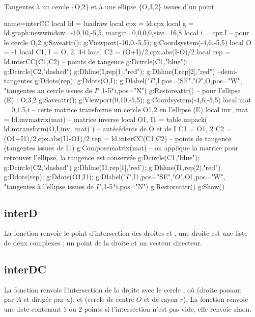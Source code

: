 \begin{demo}{Tangentes à un cercle \{O,2\} et à une ellipse \{O,3,2\} issues d'un point}
\begin{luadraw}{name=interCC}
local ld = luadraw
local cpx = ld.cpx
local g = ld.graph:new{window={-10,10,-5,5}, margin={0,0,0,0},size={16,8}}
local i = cpx.I
-- pour le cercle {O,2}
g:Saveattr(); g:Viewport(-10,0,-5,5); g:Coordsystem(-4,6,-5,5)
local O = -1
local C1, I = {O, 2}, 4-i
local C2 = {(O+I)/2,cpx.abs(I-O)/2}
local rep = ld.interCC(C1,C2) -- points de tangence
g:Dcircle(C1,"blue"); g:Dcircle(C2,"dashed")
g:Dhline(I,rep[1],"red"); g:Dhline(I,rep[2],"red") --demi-tangentes
g:Ddots(rep); g:Ddots({O,I}); g:Dlabel("$I$",I,{pos="SE"},"$O$",O,{pos="W"},
  "tangentes au cercle issues de $I$",1-5*i,{pos="N"})
g:Restoreattr()
-- pour l'ellipse (E) : {O,3,2}
g:Saveattr(); g:Viewport(0,10,-5,5); g:Coordsystem(-4,6,-5,5)
local mat = {0,1.5,i} -- cette matrice transforme un cercle {O1,2} en l'ellipse (E)
local inv_mat = ld.invmatrix(mat) -- matrice inverse
local O1, I1 = table.unpack( ld.mtransform({O,I},inv_mat) ) -- antécédents de O et de I
C1 = {O1, 2}
C2 = {(O1+I1)/2,cpx.abs(I1-O1)/2}
rep = ld.interCC(C1,C2) -- points de tangence (tangentes issues de I1)
g:Composematrix(mat) -- on applique la matrice pour retrouver l'ellipse, la tangence est conservée
g:Dcircle(C1,"blue"); g:Dcircle(C2,"dashed")
g:Dhline(I1,rep[1],'red'); g:Dhline(I1,rep[2],"red")
g:Ddots(rep); g:Ddots({O1,I1}); g:Dlabel("$I$",I1,{pos="SE"},"$O$",O1,{pos="W"},
  "tangentes à l'ellipse issues de $I$",1-5*i,{pos="N"})
g:Restoreattr()
g:Show()
\end{luadraw}
\end{demo}

\subsection{interD}
La fonction  renvoie le point d'intersection des droites  et , une droite est une liste de deux complexes : un point de la droite et un vecteur directeur.

\subsection{interDC}
La fonction  renvoie l'intersection de la droite  avec le cercle , où  (droite passant par $A$ et dirigée par $u$), et  (cercle de centre $O$ et de rayon $r$). La fonction renvoie une liste contenant $1$ ou $2$ points  si l'intersection n'est pas vide, elle renvoie \nil sinon.



